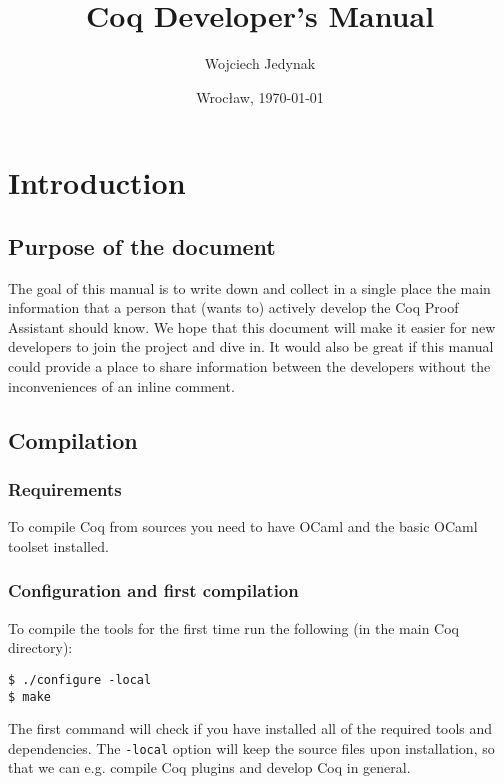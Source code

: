 \documentclass[a4paper,oneside]{book}
\author{Wojciech Jedynak}
\date{Wroc{\l}aw, \today}
\title{Coq Developer's Manual}
\begin{document}
\maketitle

\tableofcontents

\part{Introduction}

\chapter{Purpose of the document}

The goal of this manual is to write down and collect in a single place
the main information that a person that (wants to) actively develop
the Coq Proof Assistant should know. We hope that this document will
make it easier for new developers to join the project and dive in. It
would also be great if this manual could provide a place to share
information between the developers without the inconveniences of an
inline comment.

\chapter{Compilation}

\section{Requirements}

To compile Coq from sources you need to have OCaml and the basic OCaml
toolset installed. 

\section{Configuration and first compilation}

To compile the tools for the first time run the following (in the main
Coq directory):

\begin{lstlisting}
$ ./configure -local
$ make
\end{lstlisting}

The first command will check if you have installed all of the required
tools and dependencies. The \verb|-local| option will keep the source
files upon installation, so that we can e.g. compile Coq plugins and
develop Coq in general.
\end{document}
